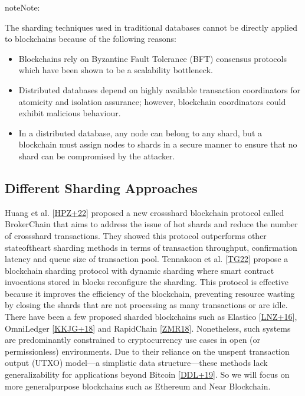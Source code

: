 \documentclass[letterpaper,10pt,english]{jupyterBook}
\begin{document}
\begin{sphinxadmonition}{note}{Note:}
\sphinxAtStartPar
{}

\sphinxAtStartPar
The sharding techniques used in traditional databases cannot be directly applied to blockchains because of the following reasons:
\begin{itemize}
\item {} 
\sphinxAtStartPar
Blockchains rely on Byzantine Fault Tolerance (BFT) consensus protocols which have been shown to be a scalability bottleneck.

\item {} 
\sphinxAtStartPar
Distributed databases depend on highly available transaction coordinators for atomicity and isolation assurance; however, blockchain coordinators could exhibit malicious behaviour.

\item {} 
\sphinxAtStartPar
In a distributed database, any node can belong to any shard, but a blockchain must assign nodes to shards in a secure manner to ensure that no shard can be compromised by the attacker.

\end{itemize}
\end{sphinxadmonition}


\subsection{Different Sharding Approaches}
\label{\detokenize{SHARDING/sharding:different-sharding-approaches}}
\sphinxAtStartPar
Huang et al. {[}\hyperlink{cite.SHARDING/sharding:id71}{HPZ+22}{]} proposed a new cross\sphinxhyphen{}shard blockchain protocol called BrokerChain that aims to address the issue of hot shards and reduce the number of cross\sphinxhyphen{}shard transactions. They showed this protocol outperforms other state\sphinxhyphen{}of\sphinxhyphen{}the\sphinxhyphen{}art sharding methods in terms of transaction throughput, confirmation latency and queue size of transaction pool.
Tennakoon et al. {[}\hyperlink{cite.SHARDING/sharding:id72}{TG22}{]} propose a blockchain sharding protocol with dynamic sharding where
smart contract invocations stored in blocks reconfigure the sharding. This protocol is effective because it improves the efficiency of the blockchain, preventing resource wasting by closing the shards that are not processing as many transactions or are idle.
There have been a few proposed sharded blockchains such as Elastico {[}\hyperlink{cite.SHARDING/sharding:id64}{LNZ+16}{]}, OmniLedger {[}\hyperlink{cite.SHARDING/sharding:id62}{KKJG+18}{]} and RapidChain {[}\hyperlink{cite.SHARDING/sharding:id63}{ZMR18}{]}. Nonetheless, such systems are predominantly constrained to cryptocurrency use cases in open (or permissionless) environments. Due to their reliance on the unspent transaction output (UTXO) model—a simplistic data structure—these methods lack generalizability for applications beyond Bitcoin {[}\hyperlink{cite.SHARDING/sharding:id61}{DDL+19}{]}. So we will focus on more general\sphinxhyphen{}purpose blockchains such as Ethereum and Near Blockchain.
\end{document}
